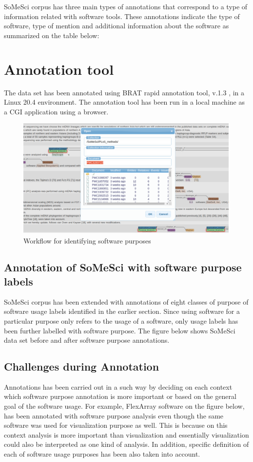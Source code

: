 SoMeSci corpus has three main types of annotations that correspond to a type of information related with software tools. These annotations indicate the type of software, type of mention and additional information about the software as summarized on the table below:


\section{Annotation tool}
\label{sec:dataset:tool}
The data set has been annotated using BRAT rapid annotation tool, v.1.3 , in a Linux 20.4 environment. The annotation tool has been run in a local machine as a CGI application using a browser. 

\begin{figure}[htbp]
	\centering
	\includegraphics[width=.75\textwidth]{4.graphics/figures/models/pdf/BRAT_tool}
	\caption{Workflow for identifying software purposes}
	\label{fig:chapter04:setup}
\end{figure}

\subsection{Annotation of SoMeSci with software purpose labels}
\label{subsec:dataset:tool:Annotationprocess}

SoMeSci corpus has been extended with annotations of eight classes of purpose of software usage labels identified in the earlier section. Since using software for a particular purpose only refers to the usage of a software, only usage labels has been further labelled with software purpose. The figure below shows SoMeSci data set before and after software purpose annotations. \\

\subsection{Challenges during Annotation }
\label{subsec:dataset:tool:Challenges}
Annotations has been carried out in a such way by deciding on each context which software purpose annotation is more important or based on the general goal of the software usage. For example, FlexArray software on the figure below, has been annotated with software purpose analysis even though the same software was used for visualization purpose as well. This is because on this context analysis is more important than visualization and essentially visualization could also be interpreted as one kind of analysis. In addition, specific definition of each of software usage purposes has been also taken into account. \\

